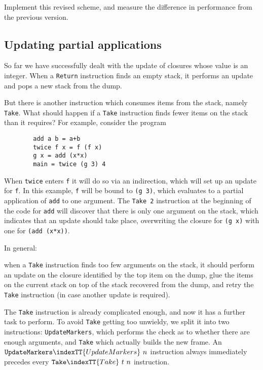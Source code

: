 \begin{exercise}
Implement this revised scheme, and measure the difference in performance
from the previous version.
\end{exercise}

\subsection{Updating partial applications}

So far we have successfully dealt with the update of closures whose value
is an integer.  When a \mbox{\tt Return} instruction finds an empty stack, it
performs an update and pops a new stack from the dump.

But there is another instruction which consumes items from the stack,
namely \mbox{\tt Take}.  What should happen if a \mbox{\tt Take} instruction finds fewer
items on the stack than it requires?  For example, consider the program
\begin{verbatim}
        add a b = a+b
        twice f x = f (f x)
        g x = add (x*x)
        main = twice (g 3) 4
\end{verbatim}
When \mbox{\tt twice} enters \mbox{\tt f} it will do so via an indirection, which will set up
an update for \mbox{\tt f}.  In this example, \mbox{\tt f} will be bound to \mbox{\tt (g\ 3)}, which
evaluates to a partial application of \mbox{\tt add} to one argument.  The \mbox{\tt Take\ 2}
instruction at the beginning of the code for \mbox{\tt add} will discover that
there is only one argument on the stack, which indicates that an update
should take place, overwriting the closure for \mbox{\tt (g\ x)} with one for
\mbox{\tt (add\ (x*x))}.

In general:
\begin{important}
when a \mbox{\tt Take} instruction finds too few arguments on the stack, it
should perform an update on the closure identified by the top item on
the dump, glue the items on the current stack on top of the stack
recovered from the dump, and retry the \mbox{\tt Take} instruction (in case another
update is required).
\end{important}

The \mbox{\tt Take} instruction is already complicated enough, and now it has a further
task to perform.  To avoid \mbox{\tt Take} getting too unwieldy, we split it into
two instructions: \mbox{\tt UpdateMarkers}, which performs the check as to whether
there are enough arguments, and \mbox{\tt Take} which actually builds the new frame.
An $\mbox{\tt UpdateMarkers}\indexTT{UpdateMarkers}~n$ instruction always immediately precedes every
$\mbox{\tt Take}\indexTT{Take}~t~n$ instruction.


